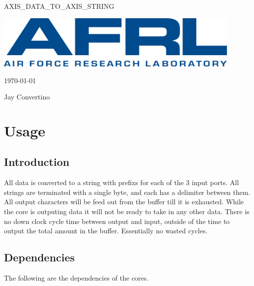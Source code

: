\begin{titlepage}
  \begin{center}

  {\Huge AXIS\_DATA\_TO\_AXIS\_STRING}

  \vspace{25mm}

  \includegraphics[width=0.90\textwidth,height=\textheight,keepaspectratio]{img/AFRL.png}

  \vspace{25mm}

  \today

  \vspace{15mm}

  {\Large Jay Convertino}

  \end{center}
\end{titlepage}

\tableofcontents

\newpage

\section{Usage}

\subsection{Introduction}

\par
All data is converted to a string with prefixs for each of the 3 input ports.
All strings are terminated with a single byte, and each has a delimiter between
them. All output characters will be feed out from the buffer till it is exhausted.
While the core is outputing data it will not be ready to take in any other data.
There is no down clock cycle time between output and input, outside of the time
to output the total amount in the buffer. Essentially no wasted cycles.

\subsection{Dependencies}

\par
The following are the dependencies of the cores.


